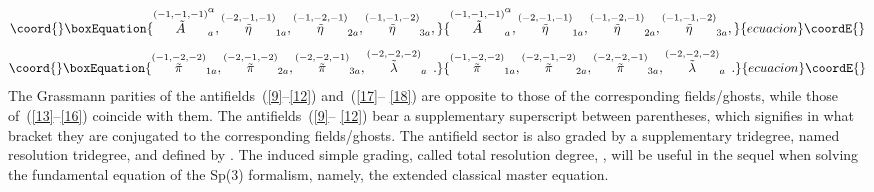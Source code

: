 \documentclass[a4paper,10pt]{article}
\begin{document}
\begin{equation}\coord{}\boxEquation{
\label{17}
\stackrel{(-1,-1,-1)}{\tilde{A}}_{a}^{\alpha },\stackrel{(-2,-1,-1)}{\tilde{
\eta}}_{1a},\stackrel{(-1,-2,-1)}{\tilde{\eta}}_{2a},\stackrel{(-1,-1,-2)}{
\tilde{\eta}}_{3a},
}{
\stackrel{(-1,-1,-1)}{\tilde{A}}_{a}^{\alpha },\stackrel{(-2,-1,-1)}{\tilde{
\eta}}_{1a},\stackrel{(-1,-2,-1)}{\tilde{\eta}}_{2a},\stackrel{(-1,-1,-2)}{
\tilde{\eta}}_{3a},
}{ecuacion}\coordE{}\end{equation}
\begin{equation}\coord{}\boxEquation{
\label{18}
\stackrel{(-1,-2,-2)}{\tilde{\pi}}_{1a},\stackrel{(-2,-1,-2)}{\tilde{\pi}}
_{2a},\stackrel{(-2,-2,-1)}{\tilde{\pi}}_{3a},\stackrel{(-2,-2,-2)}{\tilde{
\lambda}}_{a}\,.
}{
\stackrel{(-1,-2,-2)}{\tilde{\pi}}_{1a},\stackrel{(-2,-1,-2)}{\tilde{\pi}}
_{2a},\stackrel{(-2,-2,-1)}{\tilde{\pi}}_{3a},\stackrel{(-2,-2,-2)}{\tilde{
\lambda}}_{a}\,.
}{ecuacion}\coordE{}\end{equation}
The Grassmann parities of the antifields~(\ref{9}--\ref{12}) and~(\ref{17}--%
\ref{18}) are opposite to those of the corresponding fields/ghosts, while
those of~(\ref{13}--\ref{16}) coincide with them. The antifields~(\ref{9}--%
\ref{12}) bear a supplementary superscript between parentheses, which
signifies in what bracket they are conjugated to the corresponding
fields/ghosts. The antifield
sector is also graded by a supplementary tridegree, named resolution
tridegree, and defined by \coordHE{}. The induced simple
grading, called total resolution degree, \coordHE{}, will be useful in the sequel when
solving the fundamental equation of the Sp(3) formalism, namely, the
extended classical master equation.
\end{document}
